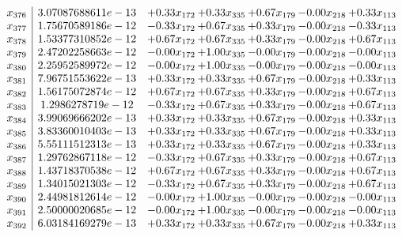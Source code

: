 \documentclass[8pt]{article}
\begin{document}
\[\begin{array}{c| c c@{\hskip 2pt} c@{\hskip 2pt} c@{\hskip 2pt} c@{\hskip 2pt} c@{\hskip 2pt} }
 x_{376}   &  3.07087688611e-13 & +  0.33 x_{172} & +  0.33 x_{335} & +  0.67 x_{179} & -0.00 x_{218} & +  0.33 x_{113}\\
 x_{377}   &  1.75670589186e-12 & -0.33 x_{172} & +  0.67 x_{335} & +  0.33 x_{179} & -0.00 x_{218} & -0.33 x_{113}\\
 x_{378}   &  1.53377310852e-12 & +  0.67 x_{172} & +  0.67 x_{335} & +  0.33 x_{179} & -0.00 x_{218} & +  0.67 x_{113}\\
 x_{379}   &  2.47202258663e-12 & -0.00 x_{172} & +  1.00 x_{335} & -0.00 x_{179} & -0.00 x_{218} & -0.00 x_{113}\\
 x_{380}   &  2.25952589972e-12 & -0.00 x_{172} & +  1.00 x_{335} & -0.00 x_{179} & -0.00 x_{218} & -0.00 x_{113}\\
 x_{381}   &  7.96751553622e-13 & +  0.33 x_{172} & +  0.33 x_{335} & +  0.67 x_{179} & -0.00 x_{218} & +  0.33 x_{113}\\
 x_{382}   &  1.56175072874e-12 & +  0.67 x_{172} & +  0.67 x_{335} & +  0.33 x_{179} & -0.00 x_{218} & +  0.67 x_{113}\\
 x_{383}   &  1.2986278719e-12 & -0.33 x_{172} & +  0.67 x_{335} & +  0.33 x_{179} & -0.00 x_{218} & +  0.67 x_{113}\\
 x_{384}   &  3.99069666202e-13 & +  0.33 x_{172} & +  0.33 x_{335} & +  0.67 x_{179} & -0.00 x_{218} & +  0.33 x_{113}\\
 x_{385}   &  3.83360010403e-13 & +  0.33 x_{172} & +  0.33 x_{335} & +  0.67 x_{179} & -0.00 x_{218} & +  0.33 x_{113}\\
 x_{386}   &  5.55111512313e-13 & +  0.33 x_{172} & +  0.33 x_{335} & +  0.67 x_{179} & -0.00 x_{218} & +  0.33 x_{113}\\
 x_{387}   &  1.29762867118e-12 & -0.33 x_{172} & +  0.67 x_{335} & +  0.33 x_{179} & -0.00 x_{218} & +  0.67 x_{113}\\
 x_{388}   &  1.43718370538e-12 & +  0.67 x_{172} & +  0.67 x_{335} & +  0.33 x_{179} & -0.00 x_{218} & +  0.67 x_{113}\\
 x_{389}   &  1.34015021303e-12 & -0.33 x_{172} & +  0.67 x_{335} & +  0.33 x_{179} & -0.00 x_{218} & +  0.67 x_{113}\\
 x_{390}   &  2.44981812614e-12 & -0.00 x_{172} & +  1.00 x_{335} & -0.00 x_{179} & -0.00 x_{218} & -0.00 x_{113}\\
 x_{391}   &  2.50000020685e-12 & -0.00 x_{172} & +  1.00 x_{335} & -0.00 x_{179} & -0.00 x_{218} & -0.00 x_{113}\\
 x_{392}   &  6.03184169279e-13 & +  0.33 x_{172} & +  0.33 x_{335} & +  0.67 x_{179} & -0.00 x_{218} & +  0.33 x_{113}\\

\end{array}\]
\end{document}
